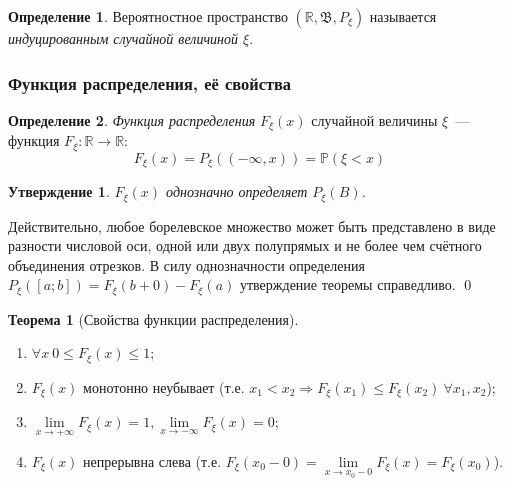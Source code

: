 \documentclass[oneside,final,14pt]{extreport}
\renewenvironment{proof}{{\bfseries Доказательство.}}{\qed}
\theoremstyle{plain}
\newtheorem*{thm*}{Утверждение}
\theoremstyle{definition}
\newtheorem*{defn}{Определение}
\theoremstyle{named}
\newtheorem*{namedthm}{Теорема}
\begin{document}
\begin{defn}
    Вероятностное пространство $(\mathbb{R}, \mathfrak{B}, P_\xi)$ называется {\it индуцированным случайной величиной $\xi$}.
\end{defn}

\subsubsection{Функция распределения, её свойства}
\begin{defn}
    {\it Функция распределения} $F_\xi (x)$ случайной величины $\xi$~--- функция $F_\xi: \mathbb{R} \rightarrow \mathbb{R}$:
    \begin{equation*}
        F_{\xi}(x)=P_{\xi}((-\infty, x))=\mathbb{P}(\xi<x)
    \end{equation*}
\end{defn}

\begin{thm*}
    $F_\xi(x)$ однозначно определяет $P_\xi(B)$.
\end{thm*}
\begin{proof}
    Действительно, любое борелевское множество может быть представлено в виде разности числовой оси, одной или двух полупрямых и не более чем счётного объединения отрезков. В силу однозначности определения $P_\xi([a;b]) = F_\xi(b + 0) - F_\xi(a)$ утверждение теоремы справедливо.
\end{proof}

\begin{namedthm}[Свойства функции распределения]\leavevmode
\begin{enumerate}
    \item $\forall x~ 0 \leqslant F_\xi(x) \leqslant 1$;
    \item $F_\xi(x)$ монотонно неубывает (т.е. $x_1 < x_2 \Rightarrow F_\xi(x_1) \leqslant F_\xi(x_2)~ \forall x_1, x_2$);
    \item $\lim\limits_{x \rightarrow +\infty} F_\xi(x) = 1, \lim\limits_{x \rightarrow -\infty} F_\xi(x) = 0$;
    \item $F_\xi(x)$ непрерывна слева (т.е. $F_\xi(x_0 - 0) = \lim\limits_{x \rightarrow x_0 - 0}F_\xi(x) = F_\xi(x_0)$).
\end{enumerate}
\end{namedthm}
\end{document}
